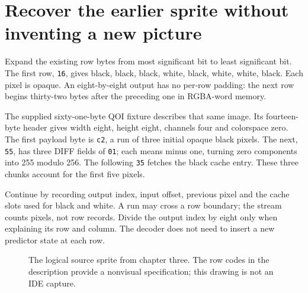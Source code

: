 \section{Recover the earlier sprite without inventing a new picture}
Expand the existing row bytes from most significant bit to least significant bit. The
first row, \texttt{16}, gives black, black, black, white, black, white, white, black.
Each pixel is opaque. An eight-by-eight output has no per-row padding: the next row
begins thirty-two bytes after the preceding one in RGBA-word memory.

The supplied sixty-one-byte QOI fixture describes that same image. Its fourteen-byte
header gives width eight, height eight, channels four and colorspace zero. The first
payload byte is \texttt{c2}, a run of three initial opaque black pixels. The next,
\texttt{55}, has three DIFF fields of \texttt{01}; each means minus one, turning
zero components into 255 modulo 256. The following \texttt{35} fetches the black cache
entry. These three chunks account for the first five pixels.

Continue by recording output index, input offset, previous pixel and the cache slots
used for black and white. A run may cross a row boundary; the stream counts pixels,
not row records. Divide the output index by eight only when explaining its row and
column. The decoder does not need to insert a new predictor state at each row.

\begin{figure}[htbp]
  \centering
  \caption{The logical source sprite from chapter three. The row codes in the description provide a nonvisual specification; this drawing is not an IDE capture.}
\end{figure}
